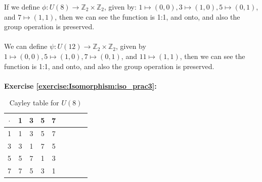 \noindent If we define $\phi : U(8) \rightarrow {\mathbb Z}_2 \times {\mathbb Z}_2$, given by: $1\mapsto (0, 0), 3 \mapsto (1, 0), 5 \mapsto (0, 1)$, and $7 \mapsto (1, 1)$, then we can see the function is 1:1, and onto, and also the group operation is preserved. 
\\
\\
We can define $\psi: U(12) \rightarrow {\mathbb Z}_2 \times {\mathbb Z}_2$, given by $1\mapsto (0, 0), 5 \mapsto (1, 0), 7 \mapsto (0, 1)$, and $11 \mapsto (1, 1)$, then we can see the function is 1:1, and onto, and also the group operation is preserved. 
\\
\\

\noindent\textbf{Exercise \ref{exercise:Isomorphism:iso_prac3}:}
\begin{table}[H]
\caption{Cayley table for $U(8)$}
{\small
\begin{center}
\begin{tabular}{c|cccccccc}
$\cdot$ & 1 & 3 & 5 & 7  \\
\hline
1        & 1 & 3 & 5 & 7  \\
3       & 3 & 1 & 7 & 5  \\
5       & 5 & 7 & 1 & 3 \\
7       & 7 & 5 & 3 & 1 \\
\end{tabular}
\end{center}
}
\end{table}


